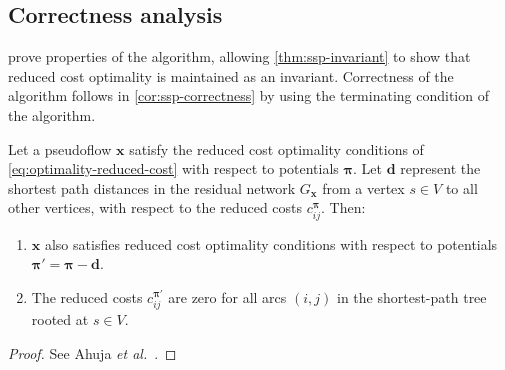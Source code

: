 \subsection{Correctness analysis} \label{appendix:impl-ssp:analysis-correctness}

 prove properties of the algorithm, allowing \cref{thm:ssp-invariant} to show that reduced cost optimality is maintained as an invariant. Correctness of the algorithm follows in \cref{cor:ssp-correctness} by using the terminating condition of the algorithm.\\

\begin{lemma} \label{lemma:ssp-reduced-costs}
    Let a pseudoflow $\mathbf{x}$ satisfy the reduced cost optimality conditions of \cref{eq:optimality-reduced-cost} with respect to potentials $\boldsymbol{\pi}$. Let $\mathbf{d}$ represent the shortest path distances in the residual network $G_{\mathbf{x}}$ from a vertex $s \in V$ to all other vertices, with respect to the reduced costs $c^{\boldsymbol{\pi}}_{ij}$. Then:
    
    \begin{enumerate}[label=(\alph*)]
        \item $\mathbf{x}$ also satisfies reduced cost optimality conditions with respect to potentials $\boldsymbol{\pi}' = \boldsymbol{\pi} - \mathbf{d}$.
        \item The reduced costs $c^{\boldsymbol{\pi}'}_{ij}$ are zero for all arcs $(i,j)$ in the shortest-path tree rooted at $s \in V$.
    \end{enumerate}
\end{lemma}
\begin{proof}
    See Ahuja \textit{et al.}~\cite[lemma~9.11]{Ahuja:1993}.
\end{proof}

